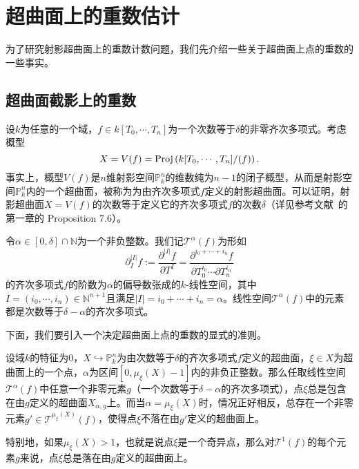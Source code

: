 \chapter{超曲面上的重数估计}
\label{chapter:main result}
为了研究射影超曲面上的重数计数问题，我们先介绍一些关于超曲面上点的重数的一些事实。

\section{超曲面截影上的重数}
设$k$为任意的一个域，$f\in k[T_0,\cdots,T_n]$为一个次数等于$\delta$的非零齐次多项式。考虑概型
\begin{equation}
X = V(f) = \operatorname{Proj}\left(k[T_0,\cdots,T_n]/(f)\right).
\end{equation}
事实上，概型$V(f)$是$n$维射影空间$\mathbb P^n_k$的维数纯为$n-1$的闭子概型，从而是射影空间$\mathbb{P}^n_k$内的一个超曲面，被称为为由齐次多项式$f$定义的射影超曲面。可以证明，射影超曲面$X = V(f)$的次数等于定义它的齐次多项式$f$的次数$\delta$（详见参考文献~的第一章的 Proposition 7.6）。

令$\alpha\in[0,\delta]\cap \mathbb N$为一个非负整数。我们记$\mathcal{T}^{\alpha}(f)$为形如
\begin{equation}
\partial^{|I|}_{I} f := \dfrac{\partial^{|I|}f}{\partial T^I} = \dfrac{\partial^{i_0+\cdots+i_n}f}{\partial T_0^{i_0}\cdots\partial T_n^{i_n}}
\end{equation}
的齐次多项式$f$的阶数为$\alpha$的偏导数张成的$k$-线性空间，其中$I = (i_0,\cdots,i_n)\in\mathbb{N}^{n+1}$且满足$|I| = i_0+\cdots+i_n = \alpha$。线性空间$\mathcal{T}^{\alpha}(f)$中的元素都是次数等于$\delta-\alpha$的齐次多项式。

下面，我们要引入一个决定超曲面上点的重数的显式的准则。

\begin{proposition} \label{taylor expansion}
设域$k$的特征为$0$，$X\hookrightarrow\mathbb P^n_k$为由次数等于$\delta$的齐次多项式$f$定义的超曲面，$\xi\in X$为超曲面上的一个点，$\alpha$为区间$[0,\mu_{\xi}(X)-1]$内的非负正整数。那么任取线性空间$\mathcal{T}^{\alpha}(f)$中任意一个非零元素$g$（一个次数等于$\delta-\alpha$的齐次多项式），点$\xi$总是包含在由$g$定义的超曲面$X_{\alpha,g}$上。而当$\alpha = \mu_{\xi}(X)$时，情况正好相反，总存在一个非零元素$g'\in\mathcal{T}^{\mu_{\xi}(X)}(f)$，使得点$\xi$不落在由$g'$定义的超曲面上。
\end{proposition}

\begin{remark}
特别地，如果$\mu_{\xi}(X) > 1$，也就是说点$\xi$是一个奇异点，那么对$\mathcal{T}^1(f)$的每个元素$g$来说，点$\xi$总是落在由$g$定义的超曲面上。
\end{remark}

